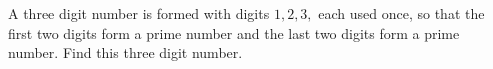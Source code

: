 A three digit number is formed with digits $1,2,3,$ each used once, so that the first two digits form a prime number and the last two digits form a prime number. Find this three digit number.
